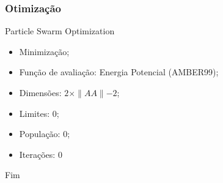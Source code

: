 \documentclass{beamer}
\begin{document}
\begin{frame}
\frametitle{Otimização}
Particle Swarm Optimization
\begin{itemize}
  \item Minimização;
  \item Função de avaliação: Energia Potencial (AMBER99);
  \item Dimensões: $2 \times \parallel AA \parallel - 2$;
  \item Limites: $0$;
  \item População: $0$;
  \item Iterações: $0$
\end{itemize}
\end{frame}

\begin{frame}
\Huge{\centerline{Fim}}
\end{frame}

\end{document}
